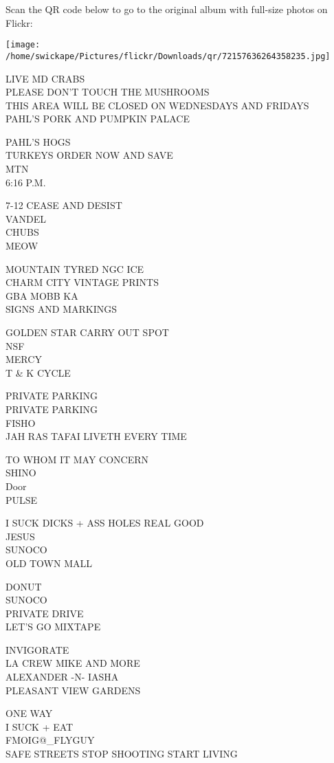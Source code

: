 \documentclass[10pt,letterpaper]{article}
\begin{document}
Scan the QR code below to go to the original album with full-size photos on Flickr:

\texttt{[image: /home/swickape/Pictures/flickr/Downloads/qr/72157636264358235.jpg]}


LIVE MD CRABS\\
PLEASE DON'T TOUCH THE MUSHROOMS\\
THIS AREA WILL BE CLOSED ON WEDNESDAYS AND FRIDAYS\\
PAHL'S PORK AND PUMPKIN PALACE

PAHL'S HOGS\\
TURKEYS ORDER NOW AND SAVE\\
MTN\\
6:16 P.M.

7{-}12 CEASE AND DESIST\\
VANDEL\\
CHUBS\\
MEOW

MOUNTAIN TYRED NGC ICE\\
CHARM CITY VINTAGE PRINTS\\
GBA MOBB KA\\
SIGNS AND MARKINGS

GOLDEN STAR CARRY OUT SPOT\\
NSF\\
MERCY\\
T \& K CYCLE

PRIVATE PARKING\\
PRIVATE PARKING\\
FISHO\\
JAH RAS TAFAI LIVETH EVERY TIME

TO WHOM IT MAY CONCERN\\
SHINO\\
Door\\
PULSE

I SUCK DICKS + ASS HOLES REAL GOOD\\
JESUS\\
SUNOCO\\
OLD TOWN MALL

DONUT\\
SUNOCO\\
PRIVATE DRIVE\\
LET'S GO MIXTAPE

INVIGORATE\\
LA CREW MIKE AND MORE\\
ALEXANDER {-}N{-} IASHA\\
PLEASANT VIEW GARDENS

ONE WAY\\
I SUCK + EAT\\
FMOIG@\_FLYGUY\\
SAFE STREETS STOP SHOOTING START LIVING
\end{document}
